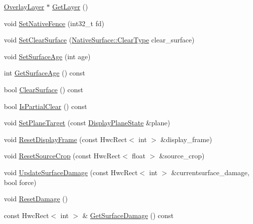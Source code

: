 \begin{DoxyCompactItemize}
\item 
\mbox{\hyperlink{structhwcomposer_1_1OverlayLayer}{Overlay\+Layer}} $\ast$ \mbox{\hyperlink{classhwcomposer_1_1NativeSurface_ad14ba0261093321209ef08a170417d06}{Get\+Layer}} ()
\item 
void \mbox{\hyperlink{classhwcomposer_1_1NativeSurface_ae063b2a36b6a7f6afbd26b7ddad97d30}{Set\+Native\+Fence}} (int32\+\_\+t fd)
\item 
void \mbox{\hyperlink{classhwcomposer_1_1NativeSurface_ad2dd3e317071362a6dfefe3df74d91b0}{Set\+Clear\+Surface}} (\mbox{\hyperlink{classhwcomposer_1_1NativeSurface_a0d0f955fc1e9f95c9684e9524f4217d6}{Native\+Surface\+::\+Clear\+Type}} clear\+\_\+surface)
\item 
void \mbox{\hyperlink{classhwcomposer_1_1NativeSurface_ae4962a443d1967e8b8434fd145441880}{Set\+Surface\+Age}} (int age)
\item 
int \mbox{\hyperlink{classhwcomposer_1_1NativeSurface_a8d8893395324edd2143ecb849409fee9}{Get\+Surface\+Age}} () const
\item 
bool \mbox{\hyperlink{classhwcomposer_1_1NativeSurface_aa949aa0e97d9d75a4a2e735cef5a0551}{Clear\+Surface}} () const
\item 
bool \mbox{\hyperlink{classhwcomposer_1_1NativeSurface_a48ffa5457f41a7a41cf746bbd8325e92}{Is\+Partial\+Clear}} () const
\item 
void \mbox{\hyperlink{classhwcomposer_1_1NativeSurface_ae9be14606ef52e79a97723c8770709da}{Set\+Plane\+Target}} (const \mbox{\hyperlink{classhwcomposer_1_1DisplayPlaneState}{Display\+Plane\+State}} \&plane)
\item 
void \mbox{\hyperlink{classhwcomposer_1_1NativeSurface_a47d68f0fa81d378f14a57d10f0e82ac9}{Reset\+Display\+Frame}} (const Hwc\+Rect$<$ int $>$ \&display\+\_\+frame)
\item 
void \mbox{\hyperlink{classhwcomposer_1_1NativeSurface_ab8dc5bcc4d8dc7d5529e193617ff126d}{Reset\+Source\+Crop}} (const Hwc\+Rect$<$ float $>$ \&source\+\_\+crop)
\item 
void \mbox{\hyperlink{classhwcomposer_1_1NativeSurface_a201535c94e9fa28789482f5841064791}{Update\+Surface\+Damage}} (const Hwc\+Rect$<$ int $>$ \&currentsurface\+\_\+damage, bool force)
\item 
void \mbox{\hyperlink{classhwcomposer_1_1NativeSurface_a27af1f56db8a926c53c93d0e2035efe9}{Reset\+Damage}} ()
\item 
const Hwc\+Rect$<$ int $>$ \& \mbox{\hyperlink{classhwcomposer_1_1NativeSurface_a9cfe44d16b854e232ae5869b815ca542}{Get\+Surface\+Damage}} () const

\end{DoxyCompactItemize}
